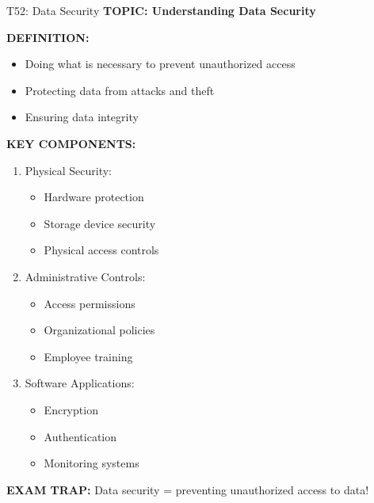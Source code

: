 \documentclass[8pt]{beamer}
\begin{document}
	\begin{frame}{T52: Data Security}
		\fontsize{6.5}{7.5}\selectfont
		\textbf{TOPIC: Understanding Data Security}
		
		\vspace{0.1cm}
		\textbf{DEFINITION:}
		\begin{itemize}
			\item Doing what is necessary to prevent unauthorized access
			\item Protecting data from attacks and theft
			\item Ensuring data integrity
		\end{itemize}
		
		\vspace{0.1cm}
		\textbf{KEY COMPONENTS:}
		\begin{enumerate}
			\item \textcolor{myblue}{Physical Security:}
			\begin{itemize}
				\item Hardware protection
				\item Storage device security
				\item Physical access controls
			\end{itemize}
			\item \textcolor{myblue}{Administrative Controls:}
			\begin{itemize}
				\item Access permissions
				\item Organizational policies
				\item Employee training
			\end{itemize}
			\item \textcolor{myblue}{Software Applications:}
			\begin{itemize}
				\item Encryption
				\item Authentication
				\item Monitoring systems
			\end{itemize}
		\end{enumerate}
		
		\textcolor{myred}{\textbf{EXAM TRAP:}} Data security = \textcolor{myblue}{preventing unauthorized access} to data!
	\end{frame}
	
\end{document}
